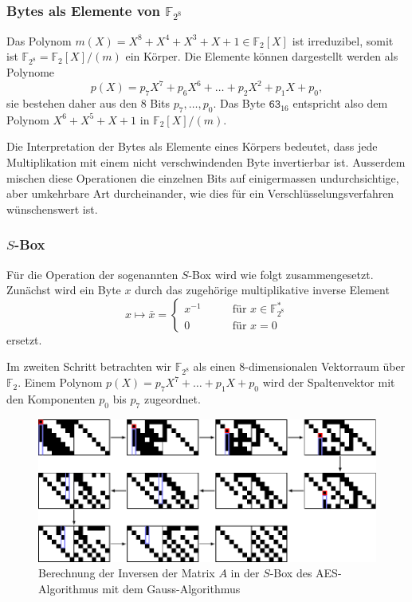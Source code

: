 \subsubsection{Bytes als Elemente von $\mathbb{F}_{2^8}$}
Das Polynom $m(X)=X^8+X^4+X^3+X+1\in \mathbb{F}_2[X]$ ist irreduzibel,
somit ist $\mathbb{F}_{2^8} = \mathbb{F}_2[X]/(m)$ ein Körper.
Die Elemente können dargestellt werden als Polynome
\[
p(X) = p_7X^7 + p_6X^6 + \dots + p_2X^2+p_1X + p_0,
\]
sie bestehen daher aus den $8$ Bits $p_7,\dots,p_0$.
Das Byte $\texttt{63}_{16}$ entspricht also dem Polynom
$X^6+X^5+X+1$ in $\mathbb{F}_2[X]/(m)$.

Die Interpretation der Bytes als Elemente eines Körpers bedeutet,
dass jede Multiplikation mit einem nicht verschwindenden Byte 
invertierbar ist.
Ausserdem mischen diese Operationen die einzelnen Bits auf einigermassen
undurchsichtige, aber umkehrbare Art durcheinander, wie dies für ein
Verschlüsselungsverfahren wünschenswert ist.

\subsubsection{$S$-Box}
Für die Operation der sogenannten $S$-Box wird wie folgt zusammengesetzt.
Zunächst wird ein Byte $x$ durch das zugehörige multiplikative
inverse Element
\[
x\mapsto \bar{x} = \begin{cases}
x^{-1}&\qquad \text{für $x\in \mathbb{F}_{2^8}^*$}\\
0     &\qquad \text{für $x=0$}
\end{cases}
\]
ersetzt.

Im zweiten Schritt betrachten wir $\mathbb{F}_{2^8}$ als einen
$8$-dimensionalen Vektorraum über $\mathbb{F}_2$.
Einem Polynom $p(X)=p_7X^7 + \dots + p_1X+p_0$ wird der Spaltenvektor
mit den Komponenten $p_0$ bis $p_7$ zugeordnet.

\begin{figure}
\centering
\includegraphics[width=\textwidth]{chapters/90-crypto/images/sbox.pdf}
\caption{Berechnung der Inversen der Matrix $A$ in der $S$-Box  des
AES-Algorithmus mit dem Gauss-Algorithmus
\label{buch:crypto:fig:sbox}}
\end{figure}

